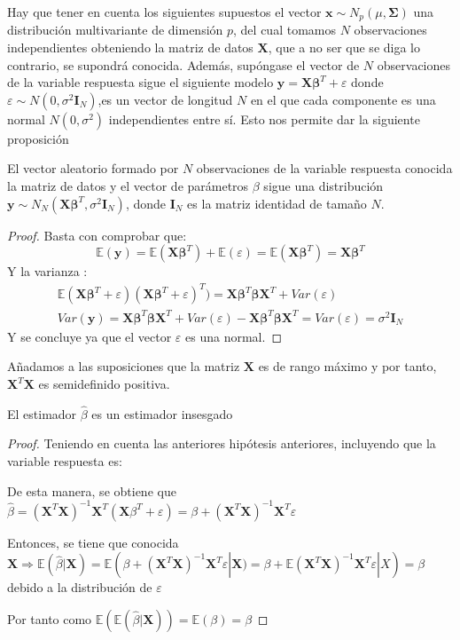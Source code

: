 \noindent Hay que tener en cuenta los siguientes supuestos el vector $\mathbf{x}\sim N_p(\mu, \mathbf{\Sigma})$ una distribución multivariante de dimensión $p$, del cual tomamos $N$ observaciones independientes obteniendo la matriz de datos $\mathbf{X}$, que a no ser que se diga lo contrario, se supondrá conocida. Además, supóngase el vector de $N$ observaciones de la variable respuesta sigue el siguiente modelo $\mathbf{y}= \mathbf{X \beta}^T+\varepsilon$ donde $\varepsilon \sim N(0,\sigma^2\mathbf{I}_N)$,es un vector de longitud $N$ en el que cada componente es una normal $N(0,\sigma^2)$  independientes entre sí. Esto nos permite dar la siguiente proposición \cite{Cuadras 2014}
\begin{propo}
El vector aleatorio formado por $N$ observaciones de la variable respuesta conocida la matriz de datos y el vector de parámetros $\beta$ sigue una distribución
$\mathbf{y}\sim N_N(\mathbf{X\beta}^T, \sigma^2\mathbf{I}_N)$, donde $\mathbf{I}_N$ es la matriz identidad de tamaño $N$.  
\begin{proof}
Basta con comprobar que:
\begin{equation}
\mathbb{E}(\mathbf{y})=\mathbb{E}(\mathbf{X\beta}^T)+\mathbb{E}(\varepsilon)=\mathbb{E}(\mathbf{X\beta}^T)=\mathbf{X\beta}^T
\end{equation}
Y la varianza :
\begin{equation}
\begin{split}
\mathbb{E}(\mathbf{X\beta}^T+\varepsilon)(\mathbf{X\beta}^T+\varepsilon)^T)=\mathbf{X\beta}^T\mathbf{\beta X}^T+ Var(\varepsilon
)\\
Var(\mathbf{y})=\mathbf{X\beta}^T\mathbf{\beta X}^T+ Var(\varepsilon
)-\mathbf{X\beta}^T\mathbf{\beta X}^T=Var(\varepsilon)=\sigma^2\mathbf{I}_N
\end{split}
\end{equation}
\noindent Y se concluye ya que el vector $\varepsilon$ es una normal. 
\end{proof}
\end{propo}
\noindent Añadamos a las suposiciones  que la matriz $\mathbf{X}$ es de rango máximo y por tanto, $\mathbf{X}^T\mathbf{X}$ es semidefinido positiva. 
\begin{propo}
El estimador $\hat{\beta}$ es un estimador insesgado \cite{Greene 2008}
\begin{proof}
Teniendo en cuenta las anteriores hipótesis anteriores, incluyendo que la variable respuesta es:  

\noindent De esta manera, se obtiene que $\hat{\beta}=(\mathbf{X}^T\mathbf{X})^{-1}\mathbf{X}^T(\mathbf{X}\beta^T+\varepsilon)=\beta+(\mathbf{X}^T\mathbf{X})^{-1}\mathbf{X}^T \varepsilon$

\noindent Entonces, se tiene que conocida $\mathbf{X} \Rightarrow \mathbb{E}(\hat{\beta}|\mathbf{X})=\mathbb{E}(\beta+(\mathbf{X}^T\mathbf{X})^{-1}\mathbf{X}^T \varepsilon|\mathbf{X})=\beta +\mathbb{E}(\mathbf{X}^T\mathbf{X})^{-1}\mathbf{X}^T \varepsilon|X)=\beta$ debido a la distribución de $\varepsilon$

\noindent Por tanto como $\mathbb{E}(\mathbb{E}(\hat{\beta}|\mathbf{X}))=\mathbb{E}(\beta)=\beta$
\end{proof}
\end{propo}

